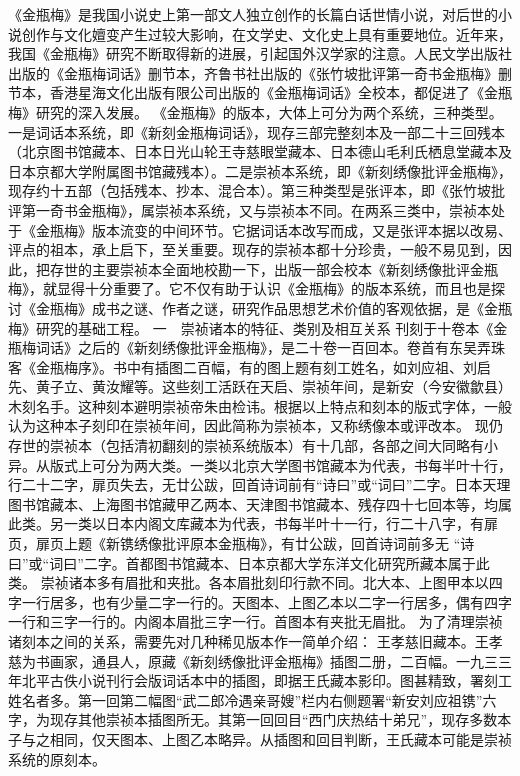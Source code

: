 \documentclass[a4paper,12pt,UTF8,twoside]{ctexbook}
\begin{document}
《金瓶梅》是我国小说史上第一部文人独立创作的长篇白话世情小说，对后世的小说创作与文化嬗变产生过较大影响，在文学史、文化史上具有重要地位。近年来，我国《金瓶梅》研究不断取得新的进展，引起国外汉学家的注意。人民文学出版社出版的《金瓶梅词话》删节本，齐鲁书社出版的《张竹坡批评第一奇书金瓶梅》删节本，香港星海文化出版有限公司出版的《金瓶梅词话》全校本，都促进了《金瓶梅》研究的深入发展。
《金瓶梅》的版本，大体上可分为两个系统，三种类型。一是词话本系统，即《新刻金瓶梅词话》，现存三部完整刻本及一部二十三回残本（北京图书馆藏本、日本日光山轮王寺慈眼堂藏本、日本德山毛利氏栖息堂藏本及日本京都大学附属图书馆藏残本）。二是崇祯本系统，即《新刻绣像批评金瓶梅》，现存约十五部（包括残本、抄本、混合本）。第三种类型是张评本，即《张竹坡批评第一奇书金瓶梅》，属崇祯本系统，又与崇祯本不同。在两系三类中，崇祯本处于《金瓶梅》版本流变的中间环节。它据词话本改写而成，又是张评本据以改易、评点的祖本，承上启下，至关重要。现存的崇祯本都十分珍贵，一般不易见到，因此，把存世的主要崇祯本全面地校勘一下，出版一部会校本《新刻绣像批评金瓶梅》，就显得十分重要了。它不仅有助于认识《金瓶梅》的版本系统，而且也是探讨《金瓶梅》成书之谜、作者之谜，研究作品思想艺术价值的客观依据，是《金瓶梅》研究的基础工程。
一　崇祯诸本的特征、类别及相互关系
刊刻于十卷本《金瓶梅词话》之后的《新刻绣像批评金瓶梅》，是二十卷一百回本。卷首有东吴弄珠客《金瓶梅序》。书中有插图二百幅，有的图上题有刻工姓名，如刘应祖、刘启先、黄子立、黄汝耀等。这些刻工活跃在天启、崇祯年间，是新安（今安徽歙县）木刻名手。这种刻本避明崇祯帝朱由检讳。根据以上特点和刻本的版式字体，一般认为这种本子刻印在崇祯年间，因此简称为崇祯本，又称绣像本或评改本。
现仍存世的崇祯本（包括清初翻刻的崇祯系统版本）有十几部，各部之间大同略有小异。从版式上可分为两大类。一类以北京大学图书馆藏本为代表，书每半叶十行，行二十二字，扉页失去，无廿公跋，回首诗词前有“诗曰”或“词曰”二字。日本天理图书馆藏本、上海图书馆藏甲乙两本、天津图书馆藏本、残存四十七回本等，均属此类。另一类以日本内阁文库藏本为代表，书每半叶十一行，行二十八字，有扉页，扉页上题《新镌绣像批评原本金瓶梅》，有廿公跋，回首诗词前多无 “诗曰”或“词曰”二字。首都图书馆藏本、日本京都大学东洋文化研究所藏本属于此类。
崇祯诸本多有眉批和夹批。各本眉批刻印行款不同。北大本、上图甲本以四字一行居多，也有少量二字一行的。天图本、上图乙本以二字一行居多，偶有四字一行和三字一行的。内阁本眉批三字一行。首图本有夹批无眉批。
为了清理崇祯诸刻本之间的关系，需要先对几种稀见版本作一简单介绍：
王孝慈旧藏本。王孝慈为书画家，通县人，原藏《新刻绣像批评金瓶梅》插图二册，二百幅。一九三三年北平古佚小说刊行会版词话本中的插图，即据王氏藏本影印。图甚精致，署刻工姓名者多。第一回第二幅图“武二郎冷遇亲哥嫂”栏内右侧题署“新安刘应祖镌”六字，为现存其他崇祯本插图所无。其第一回回目“西门庆热结十弟兄”，现存多数本子与之相同，仅天图本、上图乙本略异。从插图和回目判断，王氏藏本可能是崇祯系统的原刻本。
\end{document}

